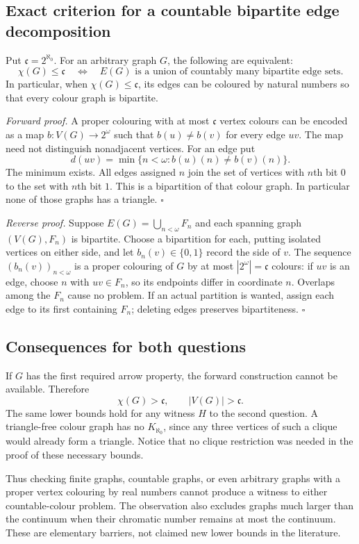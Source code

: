 \subsection{Exact criterion for a countable bipartite edge decomposition}
Put $\mathfrak c=2^{\aleph_0}$. For an arbitrary graph $G$, the following are equivalent:
\[
\chi(G)\le\mathfrak c
\quad\Longleftrightarrow\quad
E(G)\text{ is a union of countably many bipartite edge sets}.
\]
In particular, when $\chi(G)\le\mathfrak c$, its edges can be coloured by natural numbers so that every colour graph is bipartite.

\textit{Forward proof.} A proper colouring with at most $\mathfrak c$ vertex colours can be encoded as a map $b:V(G)\to2^\omega$ such that $b(u)\ne b(v)$ for every edge $uv$. The map need not distinguish nonadjacent vertices. For an edge put
\[
d(uv)=\min\{n<\omega:b(u)(n)\ne b(v)(n)\}.
\]
The minimum exists. All edges assigned $n$ join the set of vertices with $n$th bit $0$ to the set with $n$th bit $1$. This is a bipartition of that colour graph. In particular none of those graphs has a triangle. \hfill$\square$

\textit{Reverse proof.} Suppose $E(G)=\bigcup_{n<\omega}F_n$ and each spanning graph $(V(G),F_n)$ is bipartite. Choose a bipartition for each, putting isolated vertices on either side, and let $b_n(v)\in\{0,1\}$ record the side of $v$. The sequence $(b_n(v))_{n<\omega}$ is a proper colouring of $G$ by at most $|2^\omega|=\mathfrak c$ colours: if $uv$ is an edge, choose $n$ with $uv\in F_n$, so its endpoints differ in coordinate $n$. Overlaps among the $F_n$ cause no problem. If an actual partition is wanted, assign each edge to its first containing $F_n$; deleting edges preserves bipartiteness. \hfill$\square$

\subsection{Consequences for both questions}
If $G$ has the first required arrow property, the forward construction cannot be available. Therefore
\[
\chi(G)>\mathfrak c,\qquad |V(G)|>\mathfrak c.
\]
The same lower bounds hold for any witness $H$ to the second question. A triangle-free colour graph has no $K_{\aleph_0}$, since any three vertices of such a clique would already form a triangle. Notice that no clique restriction was needed in the proof of these necessary bounds.

Thus checking finite graphs, countable graphs, or even arbitrary graphs with a proper vertex colouring by real numbers cannot produce a witness to either countable-colour problem. The observation also excludes graphs much larger than the continuum when their chromatic number remains at most the continuum. These are elementary barriers, not claimed new lower bounds in the literature.

